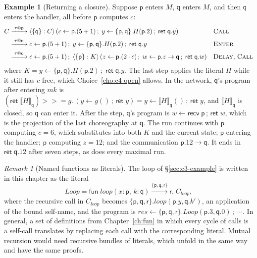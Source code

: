 \documentclass[11pt]{report}
\makeatletter
\theoremstyle{plain}
\theoremstyle{definition}
\newtheorem{example}[theorem]{Example}
\theoremstyle{remark}
\newtheorem{remark}[theorem]{Remark}
\newcommand{\kw}[1]{\mathsf{#1}}
\newcommand{\pp}{\mathsf{p}}
\newcommand{\qq}{\mathsf{q}}
\newcommand{\rr}{\mathsf{r}}
\newcommand{\bind}[3]{#1 \leftarrow #2\,;\;#3}
\newcommand{\cret}[1]{\kw{ret}\;#1}
\newcommand{\com}[3]{#1.#2 \to #3}
\newcommand{\mbind}[3]{#1 \mathbin{>\!\!>\!\!=} #2.\,#3}
\newcommand{\rt}[3]{\langle #1 : #2\rangle\,#3}
\newcommand{\tauat}[1]{\tau\mathord{@}#1}
\newcommand{\lto}[1]{\xrightarrow{\;#1\;}}
\newcommand{\nrecv}[1]{\kw{recv}\;#1}
\newcommand{\proj}[2]{\llbracket #1 \rrbracket_{#2}}
\newcommand{\cfun}[5]{\kw{fun}\;#1(#2) \xrightarrow{#3} #4.\;#5}
\newcommand{\rn}[1]{{\normalfont\scshape #1}}
\makeatother
\begin{document}
\begin{example}[Returning a closure]
  Suppose $\pp$ enters $M$, $\qq$ enters $M$, and then $\qq$ enters the
  handler, all before $\pp$ computes $c$:
  \begin{align*}
    C &\lto{\tauat{\pp}} \rt{\{\qq\}}{C}{(\bind{c}{\pp.(5+1)}{\bind{y}{\{\pp,\qq\}.H(\pp.2)}{\cret{\qq.y}}})}
      && \text{\rn{Call}}\\
      &\lto{\tauat{\qq}} \bind{c}{\pp.(5+1)}{\bind{y}{\{\pp,\qq\}.H(\pp.2)}{\cret{\qq.y}}}
      && \text{\rn{Enter}}\\
      &\lto{\tauat{\qq}} \bind{c}{\pp.(5+1)}{\rt{\{\pp\}}{K}{(\bind{z}{\pp.(2\cdot c)}{\bind{w}{\com{\pp}{z}{\qq}}{\cret{\qq.w}}})}}
      && \text{\rn{Delay}, \rn{Call}}
  \end{align*}
  where $K=\bind{y}{\{\pp,\qq\}.H(\pp.2)}{\cret{\qq.y}}$.  The last step
  applies the literal $H$ while it still has $c$ free, which
  Choice~\ref{cho:c4-open} allows.  In the network, $\qq$'s program after
  entering $\mathit{mk}$ is
  $\mbind{(\kw{ret}\;\proj{H}{\qq})}{g}{(y\leftarrow g()\,;\,\kw{ret}\;y)}=y\leftarrow\proj{H}{\qq}()\,;\,\kw{ret}\;y$,
  and $\proj{H}{\qq}$ is closed, so $\qq$ can enter it.  After the
  step, $\qq$'s program is $w\leftarrow\nrecv{\pp}\,;\,\kw{ret}\;w$, which is
  the projection of the last choreography at $\qq$.  The run continues with
  $\pp$ computing $c=6$, which substitutes into both $K$ and the current state;
  $\pp$ entering the handler; $\pp$ computing $z=12$; and the communication
  $\com{\pp}{12}{\qq}$.  It ends in $\cret{\qq.12}$ after seven steps, as does
  every maximal run.
\end{example}

\begin{remark}[Named functions as literals]
  The loop of \S\ref{sec:c3-example} is written in this chapter as the literal
  \[
    \mathit{Loop}=\cfun{\mathit{loop}}{x{:}\pp,\,k{:}\qq}{\{\pp,\qq,\rr\}}{\rr}{C_{\mathit{loop}}},
  \]
  where the recursive call in $C_{\mathit{loop}}$ becomes
  $\{\pp,\qq,\rr\}.\mathit{loop}(\pp.y,\qq.k')$, an application of the bound
  self-name, and the program is
  $\bind{\mathit{res}}{\{\pp,\qq,\rr\}.\mathit{Loop}(\pp.3,\qq.0)}{\cdots}$.
  In general, a set of definitions from Chapter~\ref{ch:fun} in which every
  cycle of calls is a self-call translates by replacing each call with the
  corresponding literal.  Mutual recursion would need recursive bundles of
  literals, which unfold in the same way and have the same proofs.
\end{remark}

\end{document}
